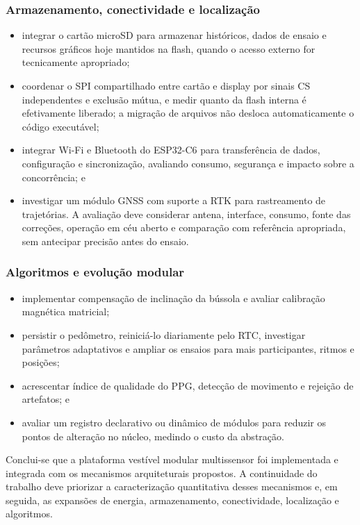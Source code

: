 \documentclass[a4paper,12pt]{article}
\begin{document}
\subsubsection{Armazenamento, conectividade e localiza\c{c}\~ao}


\begin{itemize}
    \item integrar o cart\~ao microSD para armazenar hist\'oricos, dados de ensaio e recursos gr\'aficos hoje mantidos na flash, quando o acesso externo for tecnicamente apropriado;
    \item coordenar o SPI compartilhado entre cart\~ao e display por sinais CS independentes e exclus\~ao m\'utua, e medir quanto da flash interna \'e efetivamente liberado; a migra\c{c}\~ao de arquivos n\~ao desloca automaticamente o c\'odigo execut\'avel;
    \item integrar Wi-Fi e Bluetooth do ESP32-C6 para transfer\^encia de dados, configura\c{c}\~ao e sincroniza\c{c}\~ao, avaliando consumo, seguran\c{c}a e impacto sobre a concorr\^encia; e
    \item investigar um m\'odulo GNSS com suporte a RTK para rastreamento de trajet\'orias. A avalia\c{c}\~ao deve considerar antena, interface, consumo, fonte das corre\c{c}\~oes, opera\c{c}\~ao em c\'eu aberto e compara\c{c}\~ao com refer\^encia apropriada, sem antecipar precis\~ao antes do ensaio.
\end{itemize}


\subsubsection{Algoritmos e evolu\c{c}\~ao modular}


\begin{itemize}
    \item implementar compensa\c{c}\~ao de inclina\c{c}\~ao da b\'ussola e avaliar calibra\c{c}\~ao magn\'etica matricial;
    \item persistir o ped\^ometro, reinici\'a-lo diariamente pelo RTC, investigar par\^ametros adaptativos e ampliar os ensaios para mais participantes, ritmos e posi\c{c}\~oes;
    \item acrescentar \'indice de qualidade do PPG, detec\c{c}\~ao de movimento e rejei\c{c}\~ao de artefatos; e
    \item avaliar um registro declarativo ou din\^amico de m\'odulos para reduzir os pontos de altera\c{c}\~ao no n\'ucleo, medindo o custo da abstra\c{c}\~ao.
\end{itemize}


Conclui-se que a plataforma vest\'ivel modular multissensor foi implementada e integrada com os mecanismos arquiteturais propostos. A continuidade do trabalho deve priorizar a caracteriza\c{c}\~ao quantitativa desses mecanismos e, em seguida, as expans\~oes de energia, armazenamento, conectividade, localiza\c{c}\~ao e algoritmos.
\end{document}
